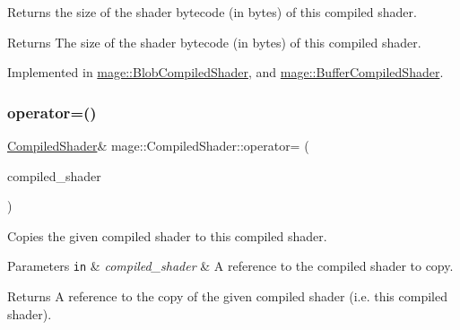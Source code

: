 Returns the size of the shader bytecode (in bytes) of this compiled shader.

\begin{DoxyReturn}{Returns}
The size of the shader bytecode (in bytes) of this compiled shader. 
\end{DoxyReturn}


Implemented in \hyperlink{structmage_1_1_blob_compiled_shader_a685f2a4aac87aa785c22940075eb23ec}{mage\+::\+Blob\+Compiled\+Shader}, and \hyperlink{structmage_1_1_buffer_compiled_shader_aa9ab3a1df896367280c259734ff29bc0}{mage\+::\+Buffer\+Compiled\+Shader}.

\hypertarget{structmage_1_1_compiled_shader_a0744c55c5847abe75b89b66ded5cda8b}{}\label{structmage_1_1_compiled_shader_a0744c55c5847abe75b89b66ded5cda8b} 
\subsubsection{\texorpdfstring{operator=()}{operator=()}\hspace{0.1cm}{\footnotesize\ttfamily [1/2]}}
{\footnotesize\ttfamily \hyperlink{structmage_1_1_compiled_shader}{Compiled\+Shader}\& mage\+::\+Compiled\+Shader\+::operator= (\begin{DoxyParamCaption}\item[{const \hyperlink{structmage_1_1_compiled_shader}{Compiled\+Shader} \&}]{compiled\+\_\+shader }\end{DoxyParamCaption})\hspace{0.3cm}{\ttfamily [delete]}}

Copies the given compiled shader to this compiled shader.


\begin{DoxyParams}[1]{Parameters}
\mbox{\tt in}  & {\em compiled\+\_\+shader} & A reference to the compiled shader to copy. \\
\hline
\end{DoxyParams}
\begin{DoxyReturn}{Returns}
A reference to the copy of the given compiled shader (i.\+e. this compiled shader). 
\end{DoxyReturn}
\hypertarget{structmage_1_1_compiled_shader_abaacfe0cbd94d14dde20d5ce2209c374}{}\label{structmage_1_1_compiled_shader_abaacfe0cbd94d14dde20d5ce2209c374} 
